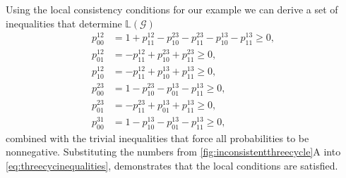 Using the local consistency conditions for our example we can derive a set of inequalities that determine $\mathbb{L}(\mathcal{G})$
\begin{equation}
\begin{aligned}\label{eq:threecycinequalities}
p^{12}_{00} &= 1 + p^{12}_{11} - p^{23}_{10} - p^{23}_{11} - p^{13}_{10} - p^{13}_{11} \geq 0, \\
p^{12}_{01} &= -p^{12}_{11} + p^{23}_{10} + p^{23}_{11} \geq 0,\\
p^{12}_{10} &= -p^{12}_{11} + p^{13}_{10} + p^{13}_{11} \geq 0,\\
p^{23}_{00} &= 1-p^{23}_{10} - p^{13}_{01} - p^{13}_{11} \geq 0,\\
p^{23}_{01} &= -p^{23}_{11} + p^{13}_{01} + p^{13}_{11} \geq 0,\\
p^{31}_{00} &= 1-p^{13}_{10} - p^{13}_{01} - p^{13}_{11} \geq 0,
\end{aligned}
\end{equation}
combined with the trivial inequalities that force all probabilities to be nonnegative. Substituting the numbers from \ref{fig:inconsistentthreecycle}A into \ref{eq:threecycinequalities}, demonstrates that the local conditions are satisfied.

